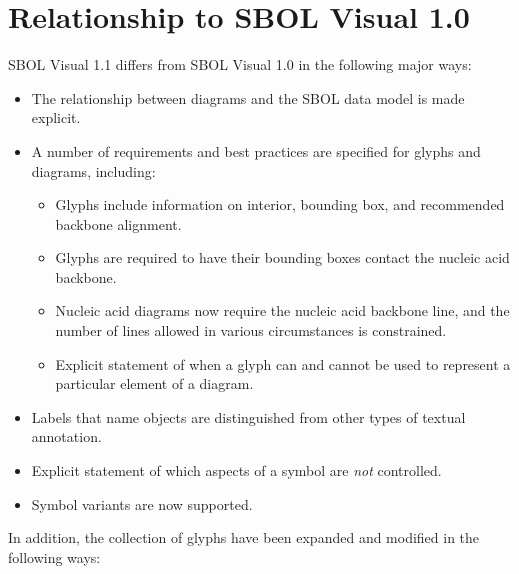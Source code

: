 \section{Relationship to SBOL Visual 1.0}\label{sec:sbol1}

SBOL Visual 1.1 differs from SBOL Visual 1.0 in the following major ways:
\begin{itemize}
\item The relationship between diagrams and the SBOL data model is made explicit.
\item A number of requirements and best practices are specified for glyphs and diagrams, including:
	\begin{itemize}
	\item Glyphs include information on interior, bounding box, and recommended backbone alignment.
	\item Glyphs are required to have their bounding boxes contact the nucleic acid backbone.
	\item Nucleic acid diagrams now require the nucleic acid backbone line, and the number of lines allowed in various circumstances is constrained.
	\item Explicit statement of when a glyph can and cannot be used to represent a particular element of a diagram.
	\end{itemize}
\item Labels that name objects are distinguished from other types of textual annotation.
\item Explicit statement of which aspects of a symbol are {\em not} controlled.
\item Symbol variants are now supported.
\end{itemize}

In addition, the collection of glyphs have been expanded and modified in the following ways:

